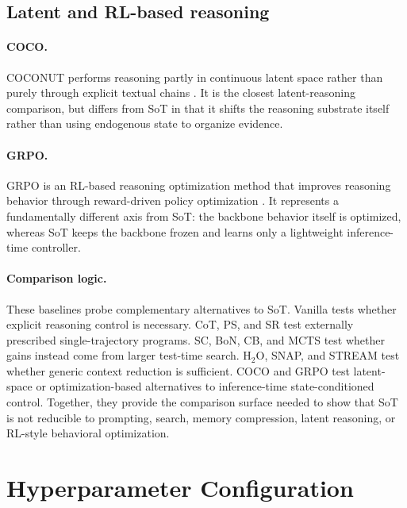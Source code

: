 \vspace{-1mm}
\subsection{Latent and RL-based reasoning}
\vspace{-1mm}

\paragraph{\textbf{COCO}.}
COCONUT performs reasoning partly in continuous latent space rather than purely through explicit textual chains \citep{hao2025training}.
It is the closest latent-reasoning comparison, but differs from SoT in that it shifts the reasoning substrate itself rather than using endogenous state to organize evidence.

\paragraph{\textbf{GRPO}.}
GRPO is an RL-based reasoning optimization method that improves reasoning behavior through reward-driven policy optimization \citep{shao2024deepseekmath}.
It represents a fundamentally different axis from SoT: the backbone behavior itself is optimized, whereas SoT keeps the backbone frozen and learns only a lightweight inference-time controller.

\paragraph{\textbf{Comparison logic}.}
These baselines probe complementary alternatives to SoT.
Vanilla tests whether explicit reasoning control is necessary.
CoT, PS, and SR test externally prescribed single-trajectory programs.
SC, BoN, CB, and MCTS test whether gains instead come from larger test-time search.
H\(_2\)O, SNAP, and STREAM test whether generic context reduction is sufficient.
COCO and GRPO test latent-space or optimization-based alternatives to inference-time state-conditioned control.
Together, they provide the comparison surface needed to show that SoT is not reducible to prompting, search, memory compression, latent reasoning, or RL-style behavioral optimization.

\vspace{-1mm}
\section{Hyperparameter Configuration}
\label{app:hyperparameters}
\vspace{-1mm}

